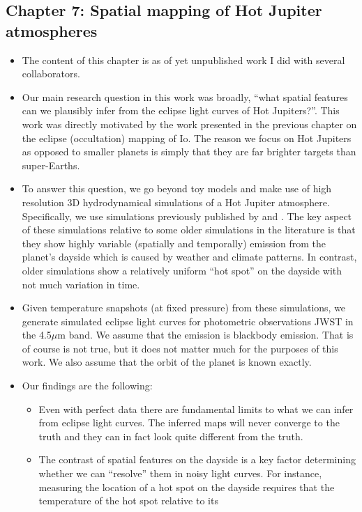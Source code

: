 \documentclass[12pt,dvipsnames]{report}
\begin{document}
\subsection{Chapter 7: Spatial mapping of Hot Jupiter atmospheres}
\begin{itemize}
\item The content of this chapter is as of yet unpublished work I did with several 
collaborators.
\item Our main research question in this work was broadly, ``what spatial features can 
we plausibly infer from the eclipse light curves of Hot Jupiters?''. This work was directly
motivated by the work presented in the previous chapter on the eclipse (occultation) mapping of Io.
The reason we focus on Hot Jupiters as opposed to smaller planets is simply that they are far brighter targets than 
super-Earths. 
\item To answer this question, we go beyond toy models and make use of high resolution 
3D hydrodynamical simulations of a Hot Jupiter atmosphere. Specifically, we use simulations 
previously published by  \citet{2021ApJ...913L..32C} and \citet{2022MNRAS.511.3584S}.
The key aspect of these simulations relative to some older simulations in the literature is 
that they show highly variable (spatially and temporally) emission from the planet's dayside
which is caused by weather and climate patterns. In contrast, older simulations show 
a relatively uniform ``hot spot'' on the dayside with not much variation in time.
\item Given temperature snapshots (at fixed pressure) from these simulations, we generate 
simulated eclipse light curves for photometric observations JWST in the 4.5$\mu$m band.
We assume that the emission is blackbody emission. That is of course is not true, but it does 
not matter much for the purposes of this work. We also assume that the orbit of the planet 
is known exactly. 
\item Our findings are the following:
\begin{itemize}
    \item Even with perfect data there are fundamental limits to what we can infer from
    eclipse light curves. The inferred maps will never converge to the truth and they 
    can in fact look quite different from the truth. 
    \item The contrast of spatial features on the dayside is a key factor determining whether 
    we can ``resolve'' them in noisy light curves. For instance, measuring the location
    of a hot spot on the dayside requires that the temperature of the hot spot relative to its

\end{itemize}
\end{itemize}
\end{document}
